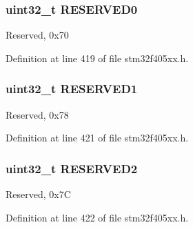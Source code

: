 \subsubsection[{\texorpdfstring{R\+E\+S\+E\+R\+V\+E\+D0}{RESERVED0}}]{\setlength{\rightskip}{0pt plus 5cm}uint32\+\_\+t R\+E\+S\+E\+R\+V\+E\+D0}\hypertarget{struct_f_s_m_c___bank2__3___type_def_af86c61a5d38a4fc9cef942a12744486b}{}\label{struct_f_s_m_c___bank2__3___type_def_af86c61a5d38a4fc9cef942a12744486b}
Reserved, 0x70 

Definition at line 419 of file stm32f405xx.\+h.

\subsubsection[{\texorpdfstring{R\+E\+S\+E\+R\+V\+E\+D1}{RESERVED1}}]{\setlength{\rightskip}{0pt plus 5cm}uint32\+\_\+t R\+E\+S\+E\+R\+V\+E\+D1}\hypertarget{struct_f_s_m_c___bank2__3___type_def_ac4ac04e673b5b8320d53f7b0947db902}{}\label{struct_f_s_m_c___bank2__3___type_def_ac4ac04e673b5b8320d53f7b0947db902}
Reserved, 0x78 

Definition at line 421 of file stm32f405xx.\+h.

\subsubsection[{\texorpdfstring{R\+E\+S\+E\+R\+V\+E\+D2}{RESERVED2}}]{\setlength{\rightskip}{0pt plus 5cm}uint32\+\_\+t R\+E\+S\+E\+R\+V\+E\+D2}\hypertarget{struct_f_s_m_c___bank2__3___type_def_a4c9b972a304c0e08ca27cbe57627c496}{}\label{struct_f_s_m_c___bank2__3___type_def_a4c9b972a304c0e08ca27cbe57627c496}
Reserved, 0x7C 

Definition at line 422 of file stm32f405xx.\+h.

